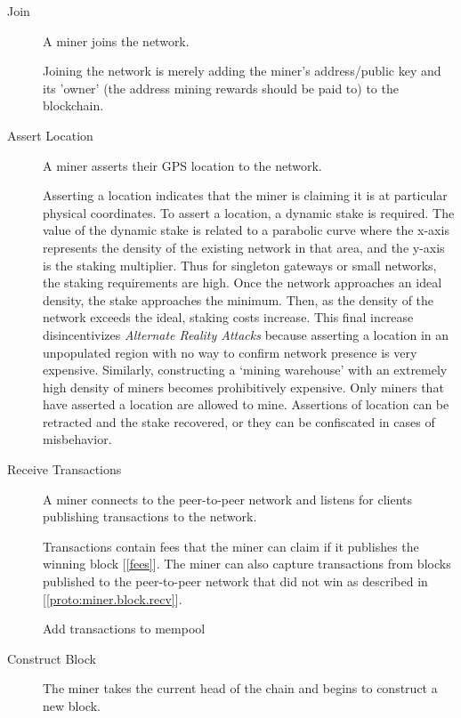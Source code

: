 \documentclass[10pt, nonatbib, nocopyrightspace, reprint]{sigplanconf}
\newenvironment{protocol}[2]{
  \begin{algorithm}[!htb]
    \DontPrintSemicolon
    \caption{#1}\label{#2}
}{
  \end{algorithm}
  \FloatBarrier
}
\newcommand{\protoref}[1]{[\autoref{#1}]}
\newcommand{\secref}[1]{[\autoref{#1}]}
\begin{document}
\begin{description}
  \item [Join] A miner joins the network.

    Joining the network is merely adding the miner's address/public key and its 'owner' (the address mining rewards should be paid to) to the blockchain.

  \item [Assert Location] A miner asserts their GPS location to the network.

    Asserting a location indicates that the miner is claiming it is at particular physical coordinates. To assert a location, a dynamic stake is required. The value of the dynamic stake is related to a parabolic curve where the x-axis represents the density of the existing network in that area, and the y-axis is the staking multiplier. Thus for singleton gateways or small networks, the staking requirements are high.  Once the network approaches an ideal density, the stake approaches the minimum. Then, as the density of the network exceeds the ideal, staking costs increase. This final increase disincentivizes \emph{Alternate Reality Attacks} because asserting a location in an unpopulated region with no way to confirm network presence is very expensive. Similarly, constructing a `mining warehouse' with an extremely high density of miners becomes prohibitively expensive. Only miners that have asserted a location are allowed to mine. Assertions of location can be retracted and the stake recovered, or they can be confiscated in cases of misbehavior.

  \item [Receive Transactions] A miner connects to the peer-to-peer network and listens for clients publishing transactions to the network.

    Transactions contain fees that the miner can claim if it publishes the winning block \secref{fees}. The miner can also capture transactions from blocks published to the peer-to-peer network that did not win as described in \protoref{proto:miner.block.recv}.


    \begin{protocol}{Miner Receive Transactions}{proto:miner.trans.recv}

       {
        Add transactions to mempool\;
      }
    \end{protocol}


  \item [Construct Block] The miner takes the current head of the chain and begins to construct a new block.


\end{description}
\end{document}
